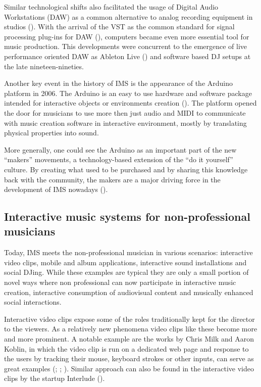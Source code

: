 \documentclass[a4paper,11pt]{article}
\begin{document}
Similar technological shifts also facilitated the usage of Digital Audio Workstations (DAW) as a common alternative to analog recording equipment in studios (\cite{leider:04}).
With the arrival of the VST as the common standard for signal processing plug-ins for DAW (\citeauthor{web:steinberg}), computers became even more essential tool for music production.
This developments were concurrent to the emergence of live performance oriented DAW as Ableton Live (\citeauthor{web:live}) and software based DJ setups at the late nineteen-nineties.

Another key event in the history of IMS is the appearance of the Arduino platform in 2006.
The Arduino is an easy to use hardware and software package intended for interactive objects or environments creation (\citeauthor{web:arduino}).
The platform opened the door for musicians to use more then just audio and MIDI to communicate with music creation software in interactive environment, mostly by translating physical properties into sound.

More generally, one could see the Arduino as an important part of the new ``makers'' movements, a technology-based extension of the ``do it yourself'' culture.
By creating what used to be purchased and by sharing this knowledge back with the community, the makers are a major driving force in the development of IMS nowadays (\cite{web:kirn12}).

\subsection{Interactive music systems for non-professional musicians}

Today, IMS meets the non-professional musician in various scenarios: interactive video clips, mobile and album applications, interactive sound installations and social DJing.
While these examples are typical they are only a small portion of novel ways where non professional can now participate in interactive music creation, interactive consumption of audiovisual content and musically enhanced social interactions.

Interactive video clips expose some of the roles traditionally kept for the director to the viewers.
As a relatively new phenomena video clips like these become more and more prominent.
A notable example are the works by Chris Milk and Aaron Koblin, in which the video clip is run on a dedicated web page and response to the users by tracking their mouse, keyboard strokes or other inputs, can serve as great examples (\citeauthor{web:milk1}; \citeauthor{web:milk2}; ).
Similar approach can also be found in the interactive video clips by the startup Interlude (\citeauthor{web:interlude}).
\end{document}

